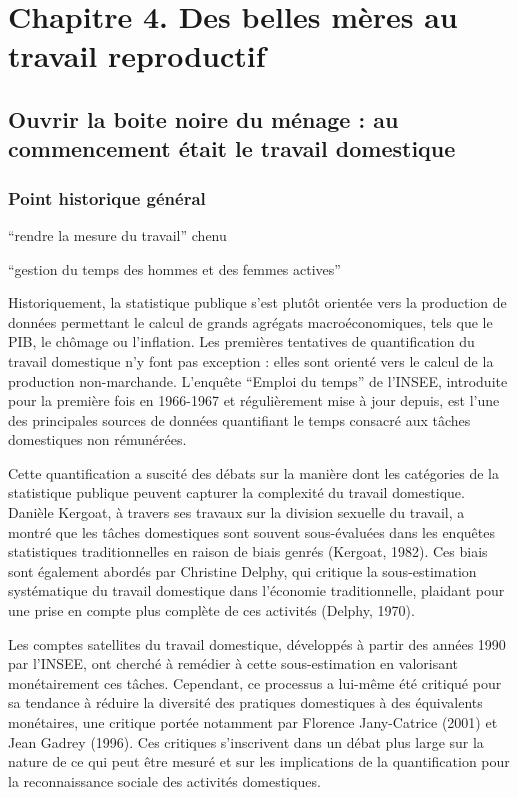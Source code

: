 \documentclass[
  12pt,
]{book}
\begin{document}
\chapter{Chapitre 4. Des belles mères au travail
reproductif}\label{chapitre-4.-des-belles-muxe8res-au-travail-reproductif}

\section{Ouvrir la boite noire du ménage : au commencement était le
travail
domestique}\label{ouvrir-la-boite-noire-du-muxe9nage-au-commencement-uxe9tait-le-travail-domestique}

\subsection{Point historique
général}\label{point-historique-guxe9nuxe9ral}

``rendre la mesure du travail'' chenu

``gestion du temps des hommes et des femmes actives''

Historiquement, la statistique publique s'est plutôt orientée vers la
production de données permettant le calcul de grands agrégats
macroéconomiques, tels que le PIB, le chômage ou l'inflation. Les
premières tentatives de quantification du travail domestique n'y font
pas exception : elles sont orienté vers le calcul de la production
non-marchande. L'enquête ``Emploi du temps'' de l'INSEE, introduite pour
la première fois en 1966-1967 et régulièrement mise à jour depuis, est
l'une des principales sources de données quantifiant le temps consacré
aux tâches domestiques non rémunérées.

Cette quantification a suscité des débats sur la manière dont les
catégories de la statistique publique peuvent capturer la complexité du
travail domestique. Danièle Kergoat, à travers ses travaux sur la
division sexuelle du travail, a montré que les tâches domestiques sont
souvent sous-évaluées dans les enquêtes statistiques traditionnelles en
raison de biais genrés (Kergoat, 1982). Ces biais sont également abordés
par Christine Delphy, qui critique la sous-estimation systématique du
travail domestique dans l'économie traditionnelle, plaidant pour une
prise en compte plus complète de ces activités (Delphy, 1970).

Les comptes satellites du travail domestique, développés à partir des
années 1990 par l'INSEE, ont cherché à remédier à cette sous-estimation
en valorisant monétairement ces tâches. Cependant, ce processus a
lui-même été critiqué pour sa tendance à réduire la diversité des
pratiques domestiques à des équivalents monétaires, une critique portée
notamment par Florence Jany-Catrice (2001) et Jean Gadrey (1996). Ces
critiques s'inscrivent dans un débat plus large sur la nature de ce qui
peut être mesuré et sur les implications de la quantification pour la
reconnaissance sociale des activités domestiques.
\end{document}
